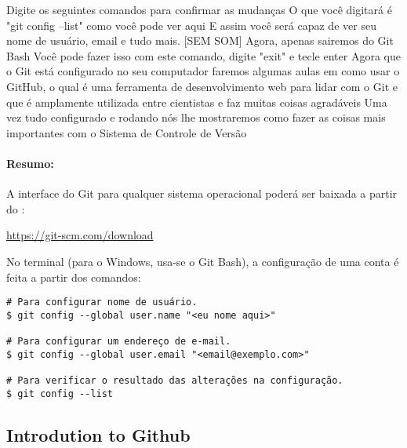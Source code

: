 Digite os seguintes comandos para confirmar as mudanças O que você digitará é "git config --list" como você pode ver aqui E assim você será capaz de ver seu nome de usuário, email e tudo mais. [SEM SOM] Agora, apenas sairemos do Git Bash Você pode fazer isso com este comando, digite "exit" e tecle enter Agora que o Git está configurado no seu computador faremos algumas aulas em como usar o GitHub, o qual é uma ferramenta de desenvolvimento web para lidar com o Git e que é amplamente utilizada entre cientistas e faz muitas coisas agradáveis Uma vez tudo configurado e rodando nós lhe mostraremos como fazer as coisas mais importantes com o Sistema de Controle de Versão


\paragraph{Resumo:}
A interface do Git para qualquer sistema operacional poderá ser baixada a partir do \link{}:

\url{https://git-scm.com/download}

No terminal (para o Windows, usa-se o Git Bash), a configuração de uma conta é feita a partir dos comandos:

\begin{verbatim}
# Para configurar nome de usuário.
$ git config --global user.name "<eu nome aqui>"

# Para configurar um endereço de e-mail.
$ git config --global user.email "<email@exemplo.com>"

# Para verificar o resultado das alterações na configuração.
$ git config --list
\end{verbatim}


\subsection{Introdution to Github}

